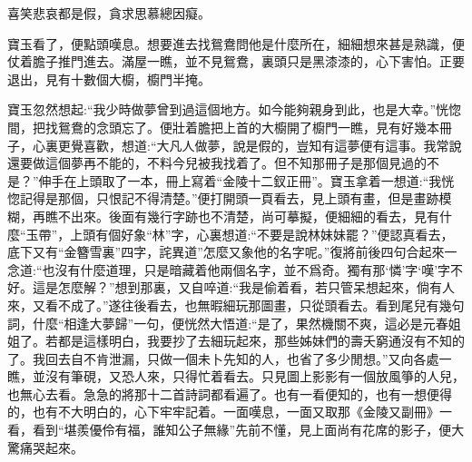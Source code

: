 \begin{poem}
    \begin{pl}
        喜笑悲哀都是假，貪求思慕總因癡。
    \end{pl}
\end{poem}


\begin{parag}
    寶玉看了，便點頭嘆息。想要進去找鴛鴦問他是什麼所在，細細想來甚是熟識，便仗着膽子推門進去。滿屋一瞧，並不見鴛鴦，裏頭只是黑漆漆的，心下害怕。正要退出，見有十數個大櫥，櫥門半掩。
\end{parag}


\begin{parag}
    寶玉忽然想起:“我少時做夢曾到過這個地方。如今能夠親身到此，也是大幸。”恍惚間，把找鴛鴦的念頭忘了。便壯着膽把上首的大櫥開了櫥門一瞧，見有好幾本冊子，心裏更覺喜歡，想道:“大凡人做夢，說是假的，豈知有這夢便有這事。我常說還要做這個夢再不能的，不料今兒被我找着了。但不知那冊子是那個見過的不是？”伸手在上頭取了一本，冊上寫着“金陵十二釵正冊”。寶玉拿着一想道:“我恍惚記得是那個，只恨記不得清楚。”便打開頭一頁看去，見上頭有畫，但是畫跡模糊，再瞧不出來。後面有幾行字跡也不清楚，尚可摹擬，便細細的看去，見有什麼“玉帶”，上頭有個好象“林”字，心裏想道:“不要是說林妹妹罷？”便認真看去，底下又有“金簪雪裏”四字，詫異道”怎麼又象他的名字呢。”復將前後四句合起來一念道:“也沒有什麼道理，只是暗藏着他兩個名字，並不爲奇。獨有那‘憐’字‘嘆’字不好。這是怎麼解？”想到那裏，又自啐道:“我是偷着看，若只管呆想起來，倘有人來，又看不成了。”遂往後看去，也無暇細玩那圖畫，只從頭看去。看到尾兒有幾句詞，什麼“相逢大夢歸”一句，便恍然大悟道:“是了，果然機關不爽，這必是元春姐姐了。若都是這樣明白，我要抄了去細玩起來，那些姊妹們的壽夭窮通沒有不知的了。我回去自不肯泄漏，只做一個未卜先知的人，也省了多少閒想。”又向各處一瞧，並沒有筆硯，又恐人來，只得忙着看去。只見圖上影影有一個放風箏的人兒，也無心去看。急急的將那十二首詩詞都看遍了。也有一看便知的，也有一想便得的，也有不大明白的，心下牢牢記着。一面嘆息，一面又取那《金陵又副冊》一看，看到“堪羨優伶有福，誰知公子無緣”先前不懂，見上面尚有花席的影子，便大驚痛哭起來。
\end{parag}



